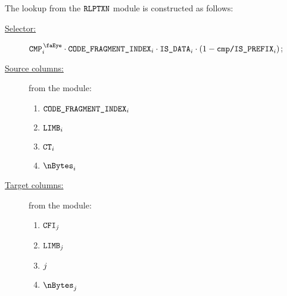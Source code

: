 The lookup from the $\texttt{RLPTXN}$ module is constructed as follows:
\begin{description}
	\item[\underline{Selector:}] $\isCmp_{i} \cdot \CFI{}_{i} \cdot \phaseData_{i} \cdot (1 - \rlpTxnComputationColumnIsPrefix_{i})$;
	\item[\underline{Source columns:}] from the \rlpTxnMod{} module:
	\begin{multicols}{3}
	\begin{enumerate}
		\item $\texttt{CODE\_FRAGMENT\_INDEX}{}_{i}$
		\item $\texttt{LIMB}_{i}$
		\item $\texttt{CT}_{i}$
		\item $\nBytes_{i}$
	\end{enumerate}
	\end{multicols}
\item[\underline{Target columns:}] from the \romMod{} module: 
	\begin{multicols}{3}
	\begin{enumerate}
		\item $\texttt{CFI}_{j}$
		\item $\texttt{LIMB}_{j}$
		\item $\index_{j}$
		\item $\nBytes_{j}$
	\end{enumerate} 
	\end{multicols}
\end{description}
